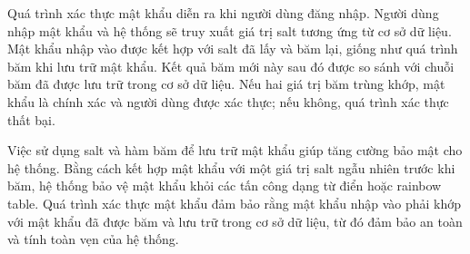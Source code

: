 \documentclass[14pt]{article}
\begin{document}
Quá trình xác thực mật khẩu diễn ra khi người dùng đăng nhập. Người dùng nhập mật khẩu và hệ thống sẽ truy xuất giá trị salt tương ứng từ cơ sở dữ liệu. Mật khẩu nhập vào được kết hợp với salt đã lấy và băm lại, giống như quá trình băm khi lưu trữ mật khẩu. Kết quả băm mới này sau đó được so sánh với chuỗi băm đã được lưu trữ trong cơ sở dữ liệu. Nếu hai giá trị băm trùng khớp, mật khẩu là chính xác và người dùng được xác thực; nếu không, quá trình xác thực thất bại.

Việc sử dụng salt và hàm băm để lưu trữ mật khẩu giúp tăng cường bảo mật cho hệ thống. Bằng cách kết hợp mật khẩu với một giá trị salt ngẫu nhiên trước khi băm, hệ thống bảo vệ mật khẩu khỏi các tấn công dạng từ điển hoặc rainbow table. Quá trình xác thực mật khẩu đảm bảo rằng mật khẩu nhập vào phải khớp với mật khẩu đã được băm và lưu trữ trong cơ sở dữ liệu, từ đó đảm bảo an toàn và tính toàn vẹn của hệ thống.
\end{document}
